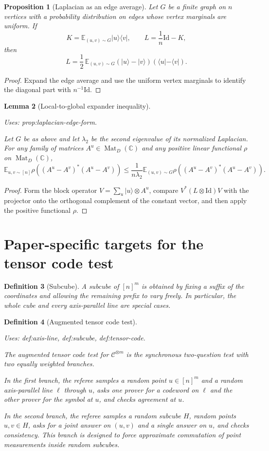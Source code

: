 \documentclass{article}
\providecommand{\uses}[1]{\par\smallskip\noindent\emph{Uses:} #1.\par\smallskip}
\newtheorem{definition}{Definition}[section]
\newtheorem{lemma}[definition]{Lemma}
\newtheorem{proposition}[definition]{Proposition}
\theoremstyle{remark}
\newcommand{\C}{\mathbb{C}}
\newcommand{\E}{\mathbb{E}}
\newcommand{\id}{\mathrm{Id}}
\newcommand{\Mat}{\operatorname{Mat}}
\newcommand{\code}{\mathcal{C}}
\begin{document}
\begin{proposition}[Laplacian as an edge average]\label{prop:laplacian-edge-form}
  Let $G$ be a finite graph on $n$ vertices with a probability distribution on edges whose vertex marginals are uniform. If
  \[
    K = \E_{(u,v)\sim G} |u\rangle\langle v|,
    \qquad
    L = \frac{1}{n}\id - K,
  \]
  then
  \[
    L = \frac12\,\E_{(u,v)\sim G} (|u\rangle-|v\rangle)(\langle u|-\langle v|).
  \]
\end{proposition}
\begin{proof}
  Expand the edge average and use the uniform vertex marginals to identify the diagonal part with $n^{-1}\id$.
\end{proof}

\begin{lemma}[Local-to-global expander inequality]\label{lem:local-to-global-expander}
  \uses{prop:laplacian-edge-form}
  Let $G$ be as above and let $\lambda_2$ be the second eigenvalue of its normalized Laplacian. For any family of matrices $A^u\in \Mat_D(\C)$ and any positive linear functional $\rho$ on $\Mat_D(\C)$,
  \[
    \E_{u,v\sim [n]} \rho((A^u-A^v)^*(A^u-A^v))
    \le
    \frac{1}{n\lambda_2}
    \E_{(u,v)\sim G} \rho((A^u-A^v)^*(A^u-A^v)).
  \]
\end{lemma}
\begin{proof}
  Form the block operator $V=\sum_u |u\rangle\otimes A^u$, compare $V^*(L\otimes \id)V$ with the projector onto the orthogonal complement of the constant vector, and then apply the positive functional $\rho$.
\end{proof}

\section{Paper-specific targets for the tensor code test}

\begin{definition}[Subcube]\label{def:subcube}
  A \emph{subcube} of $[n]^m$ is obtained by fixing a suffix of the coordinates and allowing the remaining prefix to vary freely. In particular, the whole cube and every axis-parallel line are special cases.
\end{definition}

\begin{definition}[Augmented tensor code test]\label{def:tensor-code-test}
  \uses{def:axis-line, def:subcube, def:tensor-code}
  The augmented tensor code test for $\code^{\otimes m}$ is the synchronous two-question test with two equally weighted branches.

  In the first branch, the referee samples a random point $u\in [n]^m$ and a random axis-parallel line $\ell$ through $u$, asks one prover for a codeword on $\ell$ and the other prover for the symbol at $u$, and checks agreement at $u$.

  In the second branch, the referee samples a random subcube $H$, random points $u,v\in H$, asks for a joint answer on $(u,v)$ and a single answer on $u$, and checks consistency. This branch is designed to force approximate commutation of point measurements inside random subcubes.
\end{definition}
\end{document}
